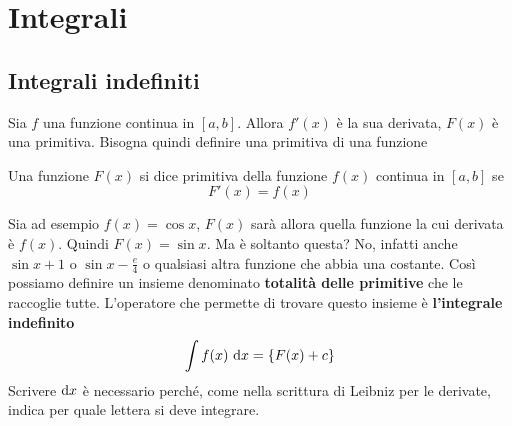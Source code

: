 
\section{Integrali}\label{sec:integrali}
\subsection{Integrali indefiniti}
Sia $f$ una funzione continua in $[{a,b}]$. Allora $f'(x)$ è la sua derivata, $F(x)$ è una primitiva.
Bisogna quindi definire una primitiva di una funzione
\begin{primitiva}
  Una funzione $F(x)$ si dice primitiva della funzione $f(x)$ continua in $[{a,b}]$ se
  \begin{equation*}
    F'(x) = f(x)
  \end{equation*}
\end{primitiva}
Sia ad esempio $f(x) = \cos x$, $F(x)$ sarà allora quella funzione la cui derivata è $f(x)$. Quindi
$F(x)=\sin x$. Ma è soltanto questa? No, infatti anche $\sin x +1$ o $\sin x -\frac{e}{4}$ o 
qualsiasi altra funzione che abbia una costante. Così possiamo definire un insieme denominato
\textbf{totalità delle primitive} che le raccoglie tutte. L'operatore che permette di trovare questo
insieme è \textbf{l'integrale indefinito}
\begin{equation*}
  \int f(x)\,\mathop{}\!\mathrm{d} x = \{F(x)+c\}
\end{equation*}
Scrivere $\mathop{}\!\mathrm{d} x$ è necessario perché, come nella scrittura di Leibniz per le derivate, indica per
quale lettera si deve integrare.

